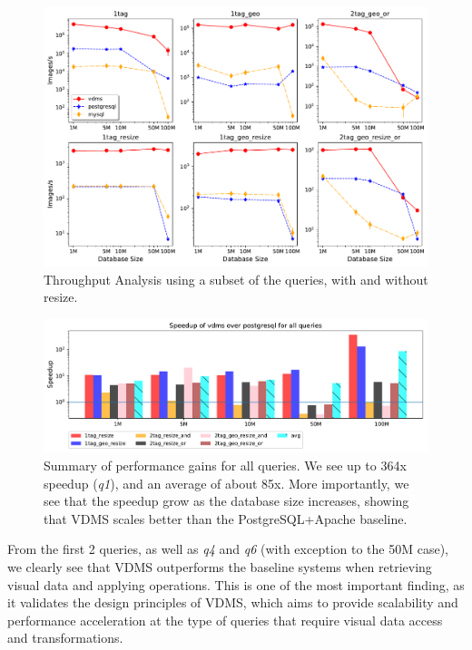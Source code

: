 
\begin{figure}[h!]
\includegraphics[width=\columnwidth]{figures/plot_th_56_mosaic_results_throughput_resize}
\caption{Throughput Analysis using a subset of the queries, with and without resize.}
\label{fig:q_throughput_56_resize}
\end{figure}

\begin{figure}[ht!]
\centering
\includegraphics[width=\textwidth]{figures/plot_th_56_query_times_speedup_postgresql}
\caption{Summary of performance gains for all queries.
We see up to 364x speedup (\textit{q1}), and an average of about 85x.
More importantly, we see that the speedup grow as the database size increases,
showing that VDMS scales better than the PostgreSQL+Apache baseline.}
\label{fig:summary_postgresql}
\end{figure}

From the first 2 queries, as well as \textit{q4} and
\textit{q6} (with exception to the 50M case),
we clearly see that VDMS outperforms the baseline systems
when retrieving visual data and applying operations.
This is one of the most important finding, as it validates the design principles
of VDMS, which aims to provide scalability and performance acceleration
at the type of queries that require visual data access and transformations.


